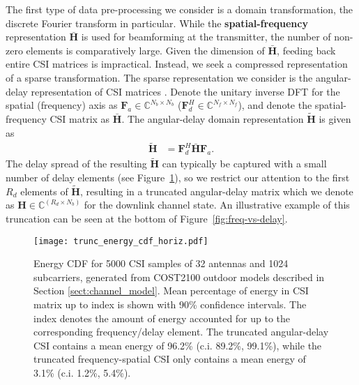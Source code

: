 The first type of data pre-processing we consider is a domain transformation, the discrete Fourier transform in particular. While the \textbf{spatial-frequency} representation $\bar{\mathbf H}$ is used for beamforming at the transmitter, the number of non-zero elements is comparatively large. Given the dimension of $\bar{\mathbf H}$, feeding back entire CSI matrices is impractical. Instead, we seek a compressed representation of a sparse transformation. The sparse representation we consider is the angular-delay representation of CSI matrices \cite{ref:sayeed2002deconstructing}. Denote the unitary inverse DFT for the spatial (frequency) axis as $\mathbf F_a \in \mathbb C^{N_b \times N_b}$ ($\mathbf F_d^H \in \mathbb C^{N_f \times N_f}$), and denote the spatial-frequency CSI matrix as $\bar{\mathbf H}$. The angular-delay domain representation $\tilde{\mathbf H}$ is given as %
\begin{align*}
	\tilde{\mathbf H} &= \mathbf F_d^H \bar{\mathbf H} \mathbf F_a.
\end{align*}
The delay spread of the resulting $\tilde{\mathbf H}$ can typically be captured with a small number of delay elements (see Figure~\ref{fig:outdoor_energy_cdf}), so we restrict our attention to the first $R_d$ elements of $\tilde{\mathbf H}$, resulting in a truncated angular-delay matrix which we denote as $\mathbf H \in \mathbb C^{(R_d\times N_b)}$ for the downlink channel state. An illustrative example of this truncation can be seen at the bottom of Figure~\ref{fig:freq-vs-delay}. %

\begin{figure}[!hbtp]
    \centering
    \texttt{[image: trunc\_energy\_cdf\_horiz.pdf]}
    \caption{Energy CDF for 5000 
    CSI samples
of 32 antennas and 1024 subcarriers, generated
  from 
COST2100 outdoor models described in Section \ref{sect:channel_model}.
Mean percentage of energy in CSI matrix up to index is shown with 90\% confidence intervals. The index denotes the amount of energy accounted for up to the corresponding frequency/delay element. The truncated angular-delay CSI contains a mean energy of 96.2\% (c.i. 89.2\%, 99.1\%), while the truncated frequency-spatial CSI only contains a mean energy of 3.1\% (c.i. 1.2\%, 5.4\%).} 
    \label{fig:outdoor_energy_cdf}
\end{figure}



